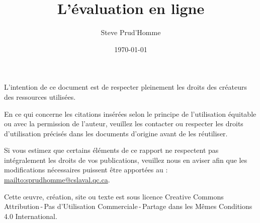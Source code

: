 \documentclass{beamer}
\begin{document}
	\title{L'évaluation en ligne} 
	\author{Steve Prud'Homme} 
	\date{\today} 

	
	
	\frame{\titlepage} 
	\usebackgroundtemplate{ } 
	
	\par L’intention de ce document est de respecter pleinement les droits des créateurs des ressources
utilisées.
	\par En ce qui concerne les citations insérées selon le principe de l'utilisation équitable ou avec la permission de l'auteur, veuillez les contacter ou respecter les droits d’utilisation précisés dans les documents d’origine avant de les réutiliser.
	\par Si vous estimez que certains éléments de ce rapport ne respectent pas intégralement les droits de vos
publications, veuillez nous en aviser afin que les modifications nécessaires puissent être apportées au : \url{mailto:sprudhomme@cslaval.qc.ca}.
	\par Cette \oe uvre, création, site ou texte est sous licence Creative Commons Attribution\,-\,Pas d’Utilisation Commerciale\,-\,Partage dans les Mêmes Conditions 4.0 International.
\end{document}
